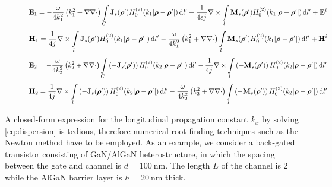 \documentclass{ieeeaccess}
\renewcommand{\v}[1]{\mathbf{#1}} %
\renewcommand{\O}{\omega}  %
\newcommand{\E}{\varepsilon}  %
\newcommand{\p}{\rho}  %
\newcommand{\vp}{\boldsymbol \p}  %
\newcommand{\x}{\times}  %
\newcommand{\del}{\nabla}  %
\renewcommand{\^}{\hat}  %
\newcommand*\diff{\mathop{}\!\mathrm{d}} %
\renewcommand{\j}{{j}\mkern1mu} %
\begin{document}
\begin{figure}[!t]
\normalsize
\setcounter{equation}{8}
\begin{equation}
\label{eq:E1scatt}
\v E_1 =
    -\frac{\O}{4 k_1^2} \left( k_1^2 + \del \del \cdot \right) \int\limits_{C} \v J_s(\vp') H_0^{(2)}(k_1 |\vp - \vp'|) \diff{l'}
    - \frac{1}{4 \E \j} \del \x \int\limits_{l} \v M_s(\vp') H_0^{(2)}(k_1 |\vp - \vp'|) \diff{l'} + \v E^i
\end{equation}
\begin{equation}
\label{eq:H1scatt}
    \v H_1 =
    \frac{1}{4 \j} \del \x \int\limits_{l} \v J_s(\vp') H_0^{(2)}(k_1 |\vp - \vp'|) \diff{l'} 
    -\frac{\O}{4 k_1^2} \left( k_1^2 + \del \del \cdot \right) \int\limits_{l} \v M_s(\vp') H_0^{(2)}(k_1 |\vp - \vp'|) \diff{l'} + \v H^i
\end{equation}
\begin{equation}
\label{eq:E2scatt}
    \v E_2 = 
    -\frac{\O}{4 k_2^2} \left( k_2^2 + \del \del \cdot \right) \int\limits_{C} \left(-\v J_s(\vp')\right) H_0^{(2)}(k_2 |\vp - \vp'|) \diff{l'}
    - \frac{1}{4 \j} \del \x \int\limits_{l} \left(-\v M_s(\vp')\right) H_0^{(2)}(k_2 |\vp - \vp'|) \diff{l'}
\end{equation}
\begin{equation}
\label{eq:H2scatt}
    \v H_2 =
    \frac{1}{4 \j} \del \x \int\limits_{l} \left(-\v J_s(\vp')\right) H_0^{(2)}(k_2 |\vp - \vp'|) \diff{l'} 
    -\frac{\O}{4 k_2^2} \left( k_2^2 + \del \del \cdot \right) \int\limits_{l} \left(-\v M_s(\vp')\right) H_0^{(2)}(k_2 |\vp - \vp'|) \diff{l'}
\end{equation}
\hrulefill
\end{figure}
A closed-form expression for the longitudinal propagation constant $k_x$ by solving \eqref{eq:dispersion} is tedious, therefore numerical root-finding techniques such as the Newton method \cite{Press2007} have to be employed. As an example, we consider a back-gated transistor consisting of GaN/AlGaN heterostructure, in which the spacing between the gate and channel is $d = \SI{100}{\nm}$. The length $L$ of the channel is \SI{2}{\micm} while the AlGaN barrier layer is $h = \SI{20}{\nm}$ thick.
\end{document}
